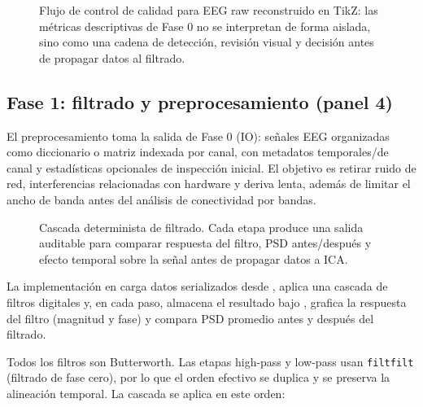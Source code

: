 \begin{fullwidth}
\begin{figure}[H]
\centering
\resizebox{0.92\fulltextwidth}{!}{\NSRawQCFlow}
\caption{Flujo de control de calidad para EEG raw reconstruido en TikZ: las métricas descriptivas de Fase 0 no se interpretan de forma aislada, sino como una cadena de detección, revisión visual y decisión antes de propagar datos al filtrado.}
\label{fig:raw-qc-threshold-flow}
\end{figure}
\end{fullwidth}

\subsection{Fase 1: filtrado y preprocesamiento (panel 4)}

El preprocesamiento toma la salida de Fase 0 (IO): señales EEG organizadas como diccionario o matriz indexada por canal, con metadatos temporales/de canal y estadísticas opcionales de inspección inicial. El objetivo es retirar ruido de red, interferencias relacionadas con hardware y deriva lenta, además de limitar el ancho de banda antes del análisis de conectividad por bandas.

\begin{fullwidth}
\begin{figure}[H]
\centering
\resizebox{0.92\fulltextwidth}{!}{\NSFilterCascade}
\caption{Cascada determinista de filtrado. Cada etapa produce una salida auditable para comparar respuesta del filtro, PSD antes/después y efecto temporal sobre la señal antes de propagar datos a ICA.}
\label{fig:generated-filter-cascade}
\end{figure}
\end{fullwidth}

La implementación en  carga datos serializados desde , aplica una cascada de filtros digitales y, en cada paso, almacena el resultado bajo , grafica la respuesta del filtro (magnitud y fase) y compara PSD promedio antes y después del filtrado.

Todos los filtros son Butterworth. Las etapas high-pass y low-pass usan \texttt{filtfilt} (filtrado de fase cero), por lo que el orden efectivo se duplica y se preserva la alineación temporal. La cascada se aplica en este orden:

